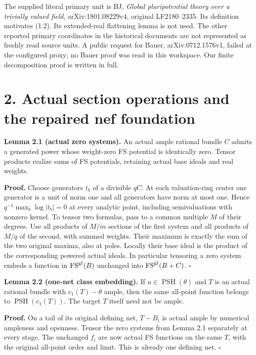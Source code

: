 \documentclass[
  10pt,
]{article}
\begin{document}
The supplied literal primary unit is BJ, \emph{Global pluripotential
theory over a trivially valued field}, arXiv:1801.08229v4, original
LF2180--2335. Its definition motivates (1.2). Its extended-real
flattening lemma is not used. The other reported primary coordinates in
the historical documents are not represented as freshly read source
units. A public request for Bauer, arXiv:0712.1576v1, failed at the
configured proxy; no Bauer proof was read in this workspace. Our finite
decomposition proof is written in full.

\section{2. Actual section operations and the repaired nef
foundation}\label{actual-section-operations-and-the-repaired-nef-foundation}

\textbf{Lemma 2.1 (actual zero systems).} An actual ample rational
bundle \(C\) admits a generated power whose weight-zero FS potential is
identically zero. Tensor products realize sums of FS potentials,
retaining actual base ideals and real weights.

\textbf{Proof.} Choose generators \(t_b\) of a divisible \(qC\). At each
valuation-ring center one generator is a unit of norm one and all
generators have norm at most one. Hence \(q^{-1}\max_b\log|t_b|=0\) at
every analytic point, including semivaluations with nonzero kernel. To
tensor two formulas, pass to a common multiple \(M\) of their degrees.
Use all products of \(M/m\) sections of the first system and all
products of \(M/q\) of the second, with summed weights. Their maximum is
exactly the sum of the two original maxima, also at poles. Locally their
base ideal is the product of the corresponding powered actual ideals. In
particular tensoring a zero system embeds a function in
\(\operatorname{FS}^{\rm gf}(B)\) unchanged into
\(\operatorname{FS}^{\rm gf}(B+C)\). \(\square\)

\textbf{Lemma 2.2 (one-net class embedding).} If
\(u\in\operatorname{PSH}(\theta)\) and \(T\) is an actual rational
bundle with \(c_1(T)-\theta\) ample, then the same all-point function
belongs to \(\operatorname{PSH}(c_1(T))\). The target \(T\) itself need
not be ample.

\textbf{Proof.} On a tail of its original defining net, \(T-B_i\) is
actual ample by numerical ampleness and openness. Tensor the zero
systems from Lemma 2.1 separately at every stage. The unchanged \(f_i\)
are now actual FS functions on the same \(T\), with the original
all-point order and limit. This is already one defining net. \(\square\)
\end{document}
